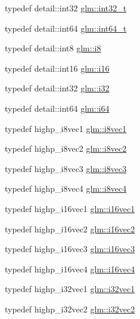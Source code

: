 \begin{DoxyCompactItemize}
\item 
typedef detail\-::int32 \hyperlink{group__gtc__type__precision_gab870c0eb6f525b0c8c4716762e0fc3a8}{glm\-::int32\-\_\-t}
\item 
typedef detail\-::int64 \hyperlink{group__gtc__type__precision_ga6abb23fbf4e39c50ec5341160b5da5ab}{glm\-::int64\-\_\-t}
\item 
typedef detail\-::int8 \hyperlink{group__gtc__type__precision_gaae064be68b7d36cd7910c16e8ad18bba}{glm\-::i8}
\item 
typedef detail\-::int16 \hyperlink{group__gtc__type__precision_ga35e5542ca05b29cc256fdafb8503d1fd}{glm\-::i16}
\item 
typedef detail\-::int32 \hyperlink{group__gtc__type__precision_ga1d8ed5c43e91ea7d4528389da4fa9524}{glm\-::i32}
\item 
typedef detail\-::int64 \hyperlink{group__gtc__type__precision_gac7a7eaad46064fc952b06df33689da23}{glm\-::i64}
\item 
typedef highp\-\_\-i8vec1 \hyperlink{group__gtc__type__precision_ga1cb1ef0f2a9266aba88f161c9062cebc}{glm\-::i8vec1}
\item 
typedef highp\-\_\-i8vec2 \hyperlink{group__gtc__type__precision_ga277312370b6155b37dbf2a6954c42915}{glm\-::i8vec2}
\item 
typedef highp\-\_\-i8vec3 \hyperlink{group__gtc__type__precision_ga97a6cae79db311cdd47c4e88a5855987}{glm\-::i8vec3}
\item 
typedef highp\-\_\-i8vec4 \hyperlink{group__gtc__type__precision_gafbf10a778016eba57d44beb585f2dc49}{glm\-::i8vec4}
\item 
typedef highp\-\_\-i16vec1 \hyperlink{group__gtc__type__precision_gacec84a02174e44363dd105769fb22473}{glm\-::i16vec1}
\item 
typedef highp\-\_\-i16vec2 \hyperlink{group__gtc__type__precision_ga37af364ff13fb791571dd324dfd3ca89}{glm\-::i16vec2}
\item 
typedef highp\-\_\-i16vec3 \hyperlink{group__gtc__type__precision_ga85e903f028d903b416a1119b00af57ea}{glm\-::i16vec3}
\item 
typedef highp\-\_\-i16vec4 \hyperlink{group__gtc__type__precision_gaf074450c0e60b45114084b1df4012a1d}{glm\-::i16vec4}
\item 
typedef highp\-\_\-i32vec1 \hyperlink{group__gtc__type__precision_ga05a766bbe2ad0791ed0081baac492da7}{glm\-::i32vec1}
\item 
typedef highp\-\_\-i32vec2 \hyperlink{group__gtc__type__precision_ga25820e641988fe33b075d80434872d02}{glm\-::i32vec2}

\end{DoxyCompactItemize}
